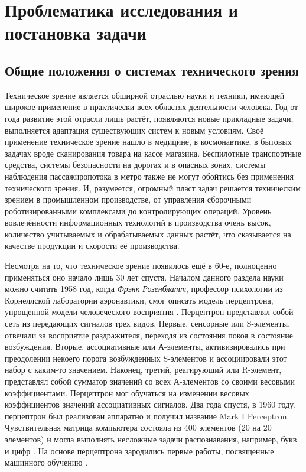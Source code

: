 \chapter{Проблематика исследования и постановка задачи} \label{chapt1}

\section{Общие положения о системах технического зрения} \label{sect1_1}

Техническое зрение является обширной отраслью науки и техники, имеющей широкое применение в практически всех областях деятельности человека. Год от года развитие этой отрасли лишь растёт, появляются новые прикладные задачи, выполняется адаптация существующих систем к новым условиям. Своё применение техническое зрение нашло в медицине, в космонавтике, в бытовых задачах вроде сканирования товара на кассе магазина. Беспилотные транспортные средства, системы безопасности на дорогах и в опасных зонах, системы наблюдения пассажиропотока в метро также не могут обойтись без применения технического зрения. И, разумеется, огромный пласт задач решается техническим зрением в промышленном производстве, от управления сборочными роботизированными комплексами до контролирующих операций. Уровень вовлечённости информационных технологий в производства очень высок, количество учитываемых и обрабатываемых данных растёт, что сказывается на качестве продукции и скорости её производства.

Несмотря на то, что техническое зрение появилось ещё в 60-е, полноценно применяться оно начало лишь 30 лет спустя. Началом данного раздела науки можно считать 1958 год, когда \textit{Фрэнк Розенблатт}, профессор психологии из Корнеллской лаборатории аэронавтики, смог описать модель перцептрона, упрощенной модели человеческого восприятия \cite{Rosenblatt}. Перцептрон представлял собой сеть из передающих сигналов трех видов. Первые, сенсорные или S-элементы, отвечали за восприятие раздражителя, переходя из состояния покоя в состояние возбуждения. Вторые, ассоциативные или А-элементы, активизировались при преодолении некоего порога возбужденных S-элементов и ассоциировали этот набор с каким-то значением. Наконец, третий, реагирующий или R-элемент, представлял собой сумматор значений со всех А-элементов со своими весовыми коэффициентами. Перцептрон мог обучаться на изменении весовых коэффициентов значений ассоциативных сигналов. Два года спустя, в 1960 году, перцептрон был реализован аппаратно и получил название Mark I Perceptron. Чувствительная матрица компьютера состояла из 400 элементов (20 на 20 элементов) и могла выполнять несложные задачи распознавания, например, букв и цифр \cite{perceptron}. На основе перцептрона зародились первые работы, посвященные машинного обучению \cite{perceptron2}.

